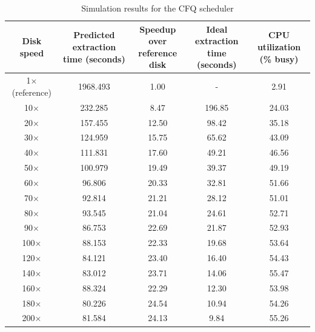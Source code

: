 \begin{table}[htbp]%
	\small
	\centering
		\caption{Simulation results for the CFQ scheduler}\label{tab:ch5-CFQ-scheduler}
	\noindent\begin{tabular}{cSSSS}
		\toprule
		\parbox{2cm}{\centering Disk speed} & \parbox{3.5cm}{\centering Predicted extraction \\ time (seconds)} & \parbox{2.5cm}{\centering Speedup over \\ reference disk} & \parbox{3cm}{\centering Ideal extraction \\ time (seconds)} & \parbox{2.5cm}{\centering CPU utilization \\ (\% busy)} \\
		\midrule
		
		1$\times$ (reference) & 1968.493 & 1.00 &  & 2.91 \\
		10$\times$ & 232.285 & 8.47 & 196.85 & 24.03 \\
		20$\times$ & 157.455 & 12.50 & 98.42 & 35.18 \\
		30$\times$ & 124.959 & 15.75 & 65.62 & 43.09 \\
		40$\times$ & 111.831 & 17.60 & 49.21 & 46.56 \\
		50$\times$ & 100.979 & 19.49 & 39.37 & 49.19 \\
		60$\times$ & 96.806 & 20.33 & 32.81 & 51.66 \\
		70$\times$ & 92.814 & 21.21 & 28.12 & 51.01 \\
		80$\times$ & 93.545 & 21.04 & 24.61 & 52.71 \\
		90$\times$ & 86.753 & 22.69 & 21.87 & 52.93 \\
		100$\times$ & 88.153 & 22.33 & 19.68 & 53.64 \\
		120$\times$ & 84.121 & 23.40 & 16.40 & 54.43 \\
		140$\times$ & 83.012 & 23.71 & 14.06 & 55.47 \\
		160$\times$ & 88.324 & 22.29 & 12.30 & 53.98 \\
		180$\times$ & 80.226 & 24.54 & 10.94 & 54.26 \\
		200$\times$ & 81.584 & 24.13 & 9.84 & 55.26 \\
		
		\bottomrule
	\end{tabular}
\end{table}%

